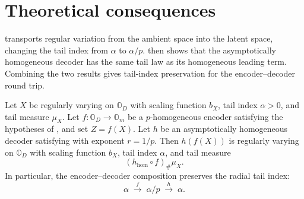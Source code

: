 




\section{Theoretical consequences}
\label{sec:theory}

 transports regular
variation from the ambient space into the latent space, changing the tail index
from \(\alpha\) to \(\alpha/p\).  then shows
that the asymptotically homogeneous decoder has the same tail law as its
homogeneous leading term. Combining the two results gives tail-index
preservation for the encoder--decoder round trip.

\begin{corollary}
\label{cor:tail-index-preservation}
Let \(X\) be regularly varying on \(\mathbb{O}_D\) with scaling function
\(b_X\), tail index \(\alpha>0\), and tail measure \(\mu_X\). Let
\(f:\mathbb{O}_D\to\mathbb{O}_m\) be a \(p\)-homogeneous encoder satisfying
the hypotheses of
, and set
\(Z=f(X)\). Let \(h\) be an asymptotically homogeneous decoder satisfying
 with exponent \(r=1/p\). Then
\(h(f(X))\) is regularly varying on \(\mathbb{O}_D\) with scaling function
\(b_X\), tail index \(\alpha\), and tail measure
\[
(h_{\mathrm{hom}}\circ f)_{\#}\mu_X.
\]
In particular, the encoder--decoder composition preserves the radial tail
index:
\[
\alpha
\;\xrightarrow{\;f\;}\;
\alpha/p
\;\xrightarrow{\;h\;}\;
\alpha.
\]
\end{corollary}


